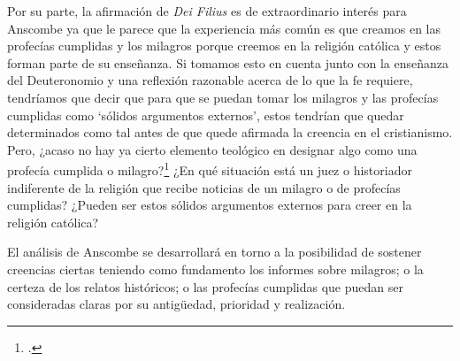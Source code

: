 Por su parte, la afirmación de \emph{Dei Filius} es de extraordinario interés para Anscombe ya que le parece que la experiencia más común es que creamos en las profecías cumplidas y los milagros porque creemos en la religión católica y estos forman parte de su enseñanza. Si tomamos esto en cuenta junto con la enseñanza del Deuteronomio y una reflexión razonable acerca de lo que la fe requiere, tendríamos que decir que para que se puedan tomar los milagros y las profecías cumplidas como \enquote*{sólidos argumentos externos}, estos tendrían que quedar determinados como tal antes de que quede afirmada la creencia en el cristianismo. Pero, ¿acaso no hay ya cierto elemento teológico en designar algo como una profecía cumplida o milagro?\footnote{\cite[Cf.][25]{anscombe2008faith:prophandmi}.} ¿En qué situación está un juez o historiador indiferente de la religión que recibe noticias de un milagro o de profecías cumplidas? ¿Pueden ser estos sólidos argumentos externos para creer en la religión católica?

El análisis de Anscombe se desarrollará en torno a la posibilidad de sostener creencias ciertas teniendo como fundamento los informes sobre milagros; o la certeza de los relatos históricos; o las profecías cumplidas que puedan ser consideradas claras por su antigüedad, prioridad y realización.

